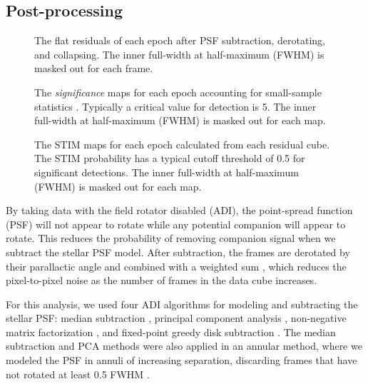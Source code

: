 \documentclass[twocolumn,linenumbers]{aastex631}
\begin{document}
\subsection{Post-processing}

\begin{figure*}
    \centering
    \caption{The flat residuals of each epoch after PSF subtraction, derotating, and collapsing. The inner full-width at half-maximum (FWHM) is masked out for each frame.}
    \label{fig:residuals}
\end{figure*}

\begin{figure*}
    \centering
    \caption{The \textit{significance} maps for each epoch accounting for small-sample statistics \citep{mawet_fundamental_2014}. Typically a critical value for detection is 5. The inner full-width at half-maximum (FWHM) is masked out for each map.}
    \label{fig:sig}
\end{figure*}

\begin{figure*}
    \centering
    \caption{The STIM maps for each epoch calculated from each residual cube. The STIM probability has a typical cutoff threshold of 0.5 for significant detections. The inner full-width at half-maximum (FWHM) is masked out for each map.}
    \label{fig:stim}
\end{figure*}

By taking data with the field rotator disabled (ADI), the point-spread function (PSF) will not appear to rotate while any potential companion will appear to rotate. This reduces the probability of removing companion signal when we subtract the stellar PSF model. After subtraction, the frames are derotated by their parallactic angle and combined with a weighted sum \citep{bottom_noise-weighted_2017}, which reduces the pixel-to-pixel noise as the number of frames in the data cube increases.

For this analysis, we used four ADI algorithms for modeling and subtracting the stellar PSF: median subtraction \citep{marois_angular_2006}, principal component analysis \citep[PCA, also referred to as KLIP;][]{soummer_detection_2012}, non-negative matrix factorization \citep[NMF;][]{ren_non-negative_2018}, and fixed-point greedy disk subtraction \citep[GreeDS;][]{pairet_reference-less_2019,pairet_mayonnaise_2020}. The median subtraction and PCA methods were also applied in an annular method, where we modeled the PSF in annuli of increasing separation, discarding frames that have not rotated at least 0.5 FWHM \citep{marois_angular_2006}.
\end{document}
